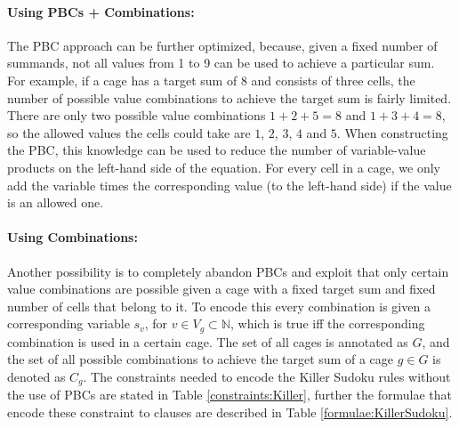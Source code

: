 \paragraph{Using PBCs + Combinations:}
The PBC approach can be further optimized, because, given a fixed number of summands, not all values from 1 to 9 can be used to achieve a particular sum. For example, if a cage has a target sum of 8 and consists of three cells, the number of possible value combinations to achieve the target sum is fairly limited. There are only two possible value combinations $1+2+5=8$ and $1+3+4=8$, so the allowed values the cells could take are $1$, $2$, $3$, $4$ and $5$. When constructing the PBC, this knowledge can be used to reduce the number of variable-value products on the left-hand side of the equation. For every cell in a cage, we only add the variable times the corresponding value (to the left-hand side) if the value is an allowed one.

\paragraph{Using Combinations:}
Another possibility is to completely abandon PBCs and exploit that only certain value combinations are possible given a cage with a fixed target sum and fixed number of cells that belong to it. To encode this every combination is given a corresponding variable $s_{v}$, for $v \in V_g  \subset\mathbb{N}$, which is true iff the corresponding combination is used in a certain cage. The set of all cages is annotated as $G$, and the set of all possible combinations to achieve the target sum of a cage $g \in G$ is denoted as $C_g$. The constraints needed to encode the Killer Sudoku rules without the use of PBCs are stated in Table \ref{constraints:Killer}, further the formulae that encode these constraint to clauses are described in Table \ref{formulae:KillerSudoku}.

